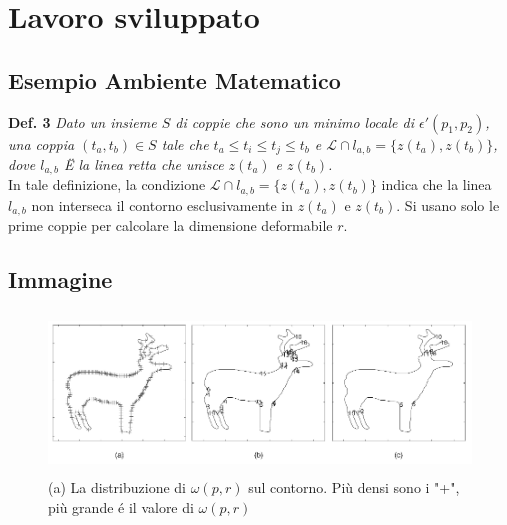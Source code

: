 \chapter{Lavoro sviluppato} 
\label{Cap3}

\section{Esempio Ambiente Matematico}
\textbf{Def. 3} \textit{Dato un insieme $S$ di coppie che sono un minimo locale di $\epsilon'(p_1,p_2)$, una coppia $(t_a,t_b) \in S$ tale che  $t_a \leq t_i \leq t_j \leq t_b$ e $\mathcal{L} \cap l_{a,b} = \lbrace z(t_a),z(t_b)\rbrace$, dove $l_{a,b}$ Ë la linea retta che unisce $z(t_a)$ e $z(t_b)$.}\\
In tale definizione, la condizione $\mathcal{L} \cap l_{a,b} = \lbrace z(t_a),z(t_b)\rbrace$ indica che la linea $l_{a,b}$ non interseca il contorno esclusivamente in $z(t_a)$ e $z(t_b)$. Si usano solo le prime coppie per calcolare la dimensione deformabile $r$.   

\section{Immagine}
\begin{figure}[h!]	
  \caption{ (a) La distribuzione di $\omega(p,r)$ sul contorno. Più densi sono i "+", più grande é il valore di $\omega(p,r)$}
  \label{contour_2}
  \centering
\includegraphics[width=126.48mm, height=42.67mm]{./Figures/contour_flex_deer.png}
\end{figure} 
